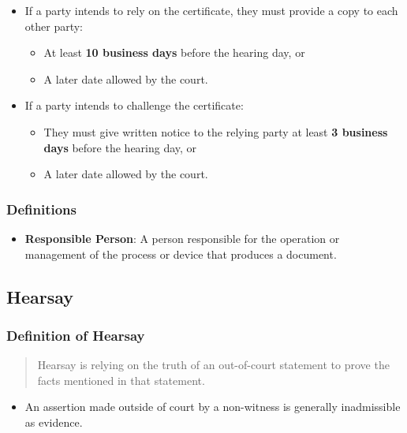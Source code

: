 \begin{itemize}
\tightlist
\item
  If a party intends to rely on the certificate, they must provide a
  copy to each other party:

  \begin{itemize}
  \tightlist
  \item
    At least \textbf{10 business days} before the hearing day, or
  \item
    A later date allowed by the court.
  \end{itemize}
\item
  If a party intends to challenge the certificate:

  \begin{itemize}
  \tightlist
  \item
    They must give written notice to the relying party at least
    \textbf{3 business days} before the hearing day, or
  \item
    A later date allowed by the court.
  \end{itemize}
\end{itemize}

\subsubsection{Definitions}\label{definitions-1}

\begin{itemize}
\tightlist
\item
  \textbf{Responsible Person}: A person responsible for the operation or
  management of the process or device that produces a document.
\end{itemize}

\subsection{  Hearsay}\label{hearsay}

\subsubsection{Definition of Hearsay}\label{definition-of-hearsay}

\begin{quote}
Hearsay is relying on the truth of an out-of-court statement to prove
the facts mentioned in that statement.
\end{quote}

\begin{itemize}
\tightlist
\item
  An assertion made outside of court by a non-witness is generally
  inadmissible as evidence.
\end{itemize}

